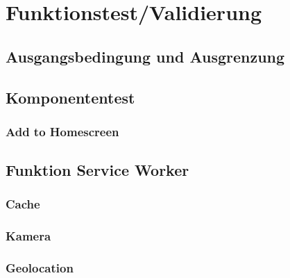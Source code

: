 \chapter{Funktionstest/Validierung}\label{chap:Funktionstest}
\thispagestyle{standard}
\pagestyle{standard}

\section{Ausgangsbedingung und Ausgrenzung}


\section{Komponententest}



\subsection{Add to Homescreen}



\section{Funktion Service Worker}



\subsection{Cache}

\subsection{Kamera}


\subsection{Geolocation}




